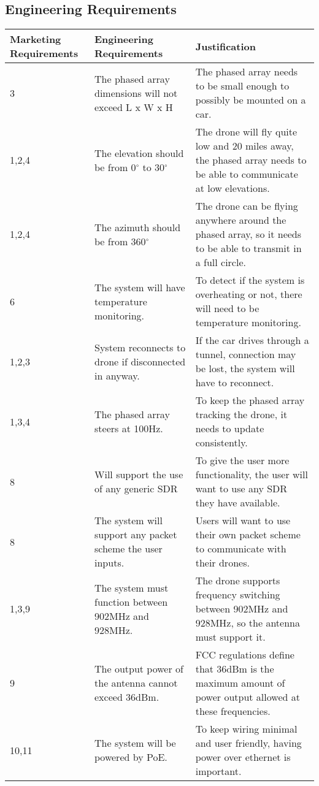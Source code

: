 \documentclass[ProductRequirements.tex]{subfiles}
\begin{document}
	\subsection{Engineering Requirements}
	\begin{center}
	\begin{tabular}{| p{2.3cm} | p{5cm} | p{7cm} |} \hline
		Marketing Requirements & Engineering Requirements & Justification \\ \hline \hline
		3 & The phased array dimensions will not exceed L x W x H & The phased array needs to be small enough to possibly be mounted on a car. \\ \hline
		1,2,4 & The elevation should be from 0$^{\circ}$ to 30$^{\circ}$ & The drone will fly quite low and 20 miles away, the phased array needs to be able to communicate at low elevations.\\\hline
		1,2,4 & The azimuth should be from 360$^{\circ}$ & The drone can be flying anywhere around the phased array, so it needs to be able to transmit in a full circle. \\\hline
		6 & The system will have temperature monitoring. & To detect if the system is overheating or not, there will need to be temperature monitoring. \\\hline
		1,2,3 & System reconnects to drone if disconnected in anyway. & If the car drives through a tunnel, connection may be lost, the system will have to reconnect. \\\hline
		1,3,4  & The phased array steers at 100Hz. & To keep the phased array tracking the drone, it needs to update consistently. \\\hline
		8 & Will support the use of any generic SDR & To give the user more functionality, the user will want to use any SDR they have available.\\\hline
		8 & The system will support any packet scheme the user inputs. & Users will want to use their own packet scheme to communicate with their drones.\\\hline
		1,3,9 & The system must function between 902MHz and 928MHz. & The drone supports frequency switching between 902MHz and 928MHz, so the antenna must support it.\\\hline
		 9 & The output power of the antenna cannot exceed 36dBm. & FCC regulations define that 36dBm is the maximum amount of power output allowed at these frequencies.\\\hline
		10,11 & The system will be powered by PoE. & To keep wiring minimal and user friendly, having power over ethernet is important. \\\hline

\end{tabular}
\end{center}
\end{document}
